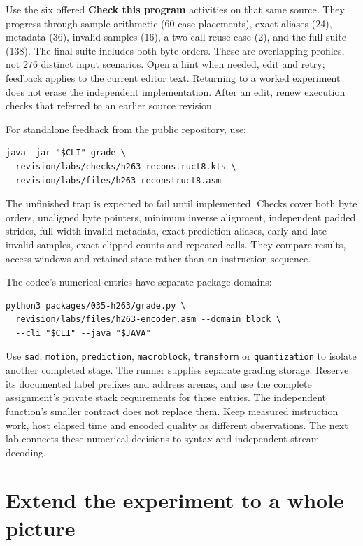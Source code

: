 Use the six offered \textbf{Check this program} activities on that same
source. They progress through sample arithmetic (60 case placements), exact aliases
(24), metadata (36), invalid samples (16), a two-call reuse case (2), and the full
suite (138). The final suite includes both byte orders. These are overlapping
profiles, not 276 distinct input scenarios. Open a hint when needed, edit and retry;
feedback applies to the current editor text. Returning to a worked experiment does
not erase the independent implementation. After an edit, renew execution checks
that referred to an earlier source revision.

For standalone feedback from the public repository, use:
\begin{Verbatim}
java -jar "$CLI" grade \
  revision/labs/checks/h263-reconstruct8.kts \
  revision/labs/files/h263-reconstruct8.asm
\end{Verbatim}
The unfinished trap is expected to fail until implemented. Checks cover both byte
orders, unaligned byte pointers, minimum inverse alignment, independent padded
strides, full-width invalid metadata, exact prediction aliases, early and late
invalid samples, exact clipped counts and repeated calls. They compare results,
access windows and retained state rather than an instruction sequence.

The codec's numerical entries have separate package domains:
\MARSCodeLabel{Check the complete local block pipeline}
\begin{Verbatim}
python3 packages/035-h263/grade.py \
  revision/labs/files/h263-encoder.asm --domain block \
  --cli "$CLI" --java "$JAVA"
\end{Verbatim}
Use \texttt{sad}, \texttt{motion}, \texttt{prediction}, \texttt{macroblock},
\texttt{transform} or \texttt{quantization} to isolate another completed stage.
The runner supplies separate grading storage. Reserve its documented label prefixes
and address arenas, and use the complete assignment's private stack requirements
for those entries. The independent function's smaller contract does not replace
them. Keep measured instruction work, host elapsed time and encoded quality as
different observations. The next lab connects these numerical decisions to syntax
and independent stream decoding.

\section{Extend the experiment to a whole picture}

